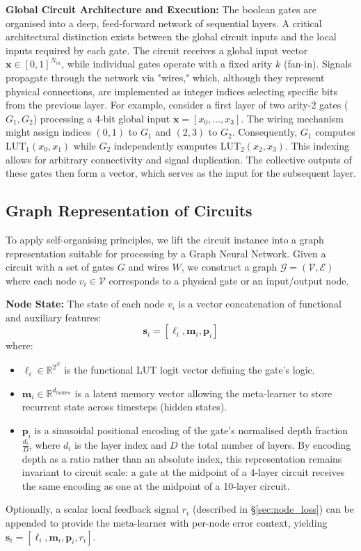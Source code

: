 \textbf{Global Circuit Architecture and Execution:}
The boolean gates are organised into a deep, feed-forward network of sequential layers. A critical architectural distinction exists between the global circuit inputs and the local inputs required by each gate. The circuit receives a global input vector $\mathbf{x} \in [0, 1]^{N_{in}}$, while individual gates operate with a fixed arity $k$ (fan-in). Signals propagate through the network via "wires," which, although they represent physical connections, are implemented as integer indices selecting specific bits from the previous layer. For example, consider a first layer of two arity-2 gates ($G_1, G_2$) processing a 4-bit global input $\mathbf{x} = [x_0, \dots, x_3]$. The wiring mechanism might assign indices $(0, 1)$ to $G_1$ and $(2, 3)$ to $G_2$. Consequently, $G_1$ computes $\text{LUT}_1(x_0, x_1)$ while $G_2$ independently computes $\text{LUT}_2(x_2, x_3)$. This indexing allows for arbitrary connectivity and signal duplication. The collective outputs of these gates then form a vector, which serves as the input for the subsequent layer.

\subsection{Graph Representation of Circuits}
To apply self-organising principles, we lift the circuit instance into a graph representation suitable for processing by a Graph Neural Network.
Given a circuit with a set of gates $G$ and wires $W$, we construct a graph $\mathcal{G} = (\mathcal{V}, \mathcal{E})$ where each node $v_i \in \mathcal{V}$ corresponds to a physical gate or an input/output node.

\textbf{Node State:}
The state of each node $v_i$ is a vector concatenation of functional and auxiliary features:
$$\mathbf{s}_i = [\boldsymbol{\ell}_i, \mathbf{m}_i, \mathbf{p}_i]$$
where:
\begin{itemize}
    \item $\boldsymbol{\ell}_i \in \mathbb{R}^{2^N}$ is the functional LUT logit vector defining the gate's logic.
    \item $\mathbf{m}_i \in \mathbb{R}^{d_{hidden}}$ is a latent memory vector allowing the meta-learner to store recurrent state across timesteps (hidden states).
    \item $\mathbf{p}_i$ is a sinusoidal positional encoding of the gate's normalised depth fraction $\frac{d_i}{D}$, where $d_i$ is the layer index and $D$ the total number of layers. By encoding depth as a ratio rather than an absolute index, this representation remains invariant to circuit scale: a gate at the midpoint of a 4-layer circuit receives the same encoding as one at the midpoint of a 10-layer circuit.
\end{itemize}
Optionally, a scalar local feedback signal $r_i$ (described in \S\ref{sec:node_loss}) can be appended to provide the meta-learner with per-node error context, yielding $\mathbf{s}_i = [\boldsymbol{\ell}_i, \mathbf{m}_i, \mathbf{p}_i, r_i]$.

